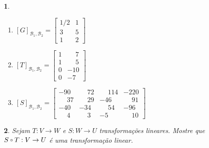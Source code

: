 \documentclass[12pt]{exam}
\newtheorem{exercicio}{}
\newcommand{\compcent}[1]{\vcenter{\hbox{$#1\circ$}}}
\newcommand{\comp}{\mathbin{\mathchoice
{\compcent\scriptstyle}{\compcent\scriptstyle}
{\compcent\scriptscriptstyle}{\compcent\scriptscriptstyle}}}
\begin{document}
\begin{exercicio}
\begin{solucao}
\begin{enumerate}[label=({\alph*})]
        \item $[G]_{\mathcal{B}_1, \mathcal{B}_2} = \begin{bmatrix}
          1/2 & 1\\
          3 & 5\\
          1 & 2
        \end{bmatrix}$

        \item $[T]_{\mathcal{B}_1, \mathcal{B}_2} = \begin{bmatrix}
          1 & \phantom{-}7\\
          1 & \phantom{-}5\\
          0 & -10\\
          0 & -7
        \end{bmatrix}$

        \item $[S]_{\mathcal{B}_1, \mathcal{B}_2} = \begin{bmatrix}
          -90 & \phantom{-}72 & \phantom{-}114 & -220\\
          \phantom{-}37 & \phantom{-}29 & -46 & \phantom{-}91\\
          -40 & -34 & \phantom{-}54 & -96\\
          \phantom{-}4 & \phantom{-}3 & -5 & \phantom{-}10
        \end{bmatrix}$
      \end{enumerate}
    \end{solucao}
\end{exercicio}

\begin{exercicio}
  Sejam $T : V \to W$ e $S : W \to U$ transforma\c{c}\~oes lineares. Mostre que $S \comp T : V \to U$ \'e uma transforma\c{c}\~ao linear.
\end{exercicio}
\end{document}
